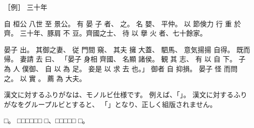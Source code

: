 \documentclass[paper=a5,tate]{jlreq}
\newcommand*{\onelineskip}{\par\vspace{\baselineskip}\par}
\begin{document}
［例］
三十年

自
桓公
八世
至
景公。
有
晏
子
者、
之。
名
嬰、
平仲。
以
節倹力
行
重
於
齊。
三十年、豚肩
不
豆。齊國之士、
待
以
擧
火
者、七十餘家。

晏子
出。
其御之妻、
従
門間
窺、
其夫
擁
大蓋、
駟馬、
意気揚揚
自得。
既而
帰。
妻請
去
曰、
「晏子
身相
齊國、
名顯
諸侯。
観
其
志、
有
以
自
下。
子
為
人
僕御、
自
以
為
足。
妾是
以
求
去
也。」
御者
自
抑損。
晏子
怪
而問
之。
以
實
。
薦
為
大夫。

\onelineskip

漢文に対するふりがなは、モノルビ仕様です。
例えば、「」。
漢文に対するふりがなをグループルビとすると、
「」となり、正しく組版されません。

□。
□□□□□□
□、□□□□□
□。
\end{document}
